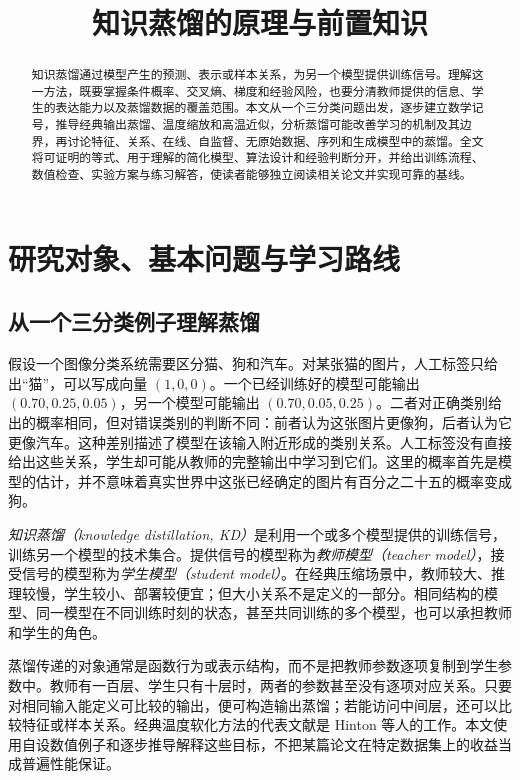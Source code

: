 \documentclass[UTF8,12pt,a4paper,fontset=fandol]{ctexart}
\title{知识蒸馏的原理与前置知识}
\author{}
\date{}
\begin{document}
\maketitle

\begin{abstract}
知识蒸馏通过模型产生的预测、表示或样本关系，为另一个模型提供训练信号。理解这一方法，既要掌握条件概率、交叉熵、梯度和经验风险，也要分清教师提供的信息、学生的表达能力以及蒸馏数据的覆盖范围。本文从一个三分类问题出发，逐步建立数学记号，推导经典输出蒸馏、温度缩放和高温近似，分析蒸馏可能改善学习的机制及其边界，再讨论特征、关系、在线、自监督、无原始数据、序列和生成模型中的蒸馏。全文将可证明的等式、用于理解的简化模型、算法设计和经验判断分开，并给出训练流程、数值检查、实验方案与练习解答，使读者能够独立阅读相关论文并实现可靠的基线。
\end{abstract}
\tableofcontents

\section{研究对象、基本问题与学习路线}
\label{sec:kd-introduction}

\subsection{从一个三分类例子理解蒸馏}
假设一个图像分类系统需要区分猫、狗和汽车。对某张猫的图片，人工标签只给出“猫”，可以写成向量 $(1,0,0)$。一个已经训练好的模型可能输出 $(0.70,0.25,0.05)$，另一个模型可能输出 $(0.70,0.05,0.25)$。二者对正确类别给出的概率相同，但对错误类别的判断不同：前者认为这张图片更像狗，后者认为它更像汽车。这种差别描述了模型在该输入附近形成的类别关系。人工标签没有直接给出这些关系，学生却可能从教师的完整输出中学习到它们。这里的概率首先是模型的估计，并不意味着真实世界中这张已经确定的图片有百分之二十五的概率变成狗。

\emph{知识蒸馏（knowledge distillation, KD）}是利用一个或多个模型提供的训练信号，训练另一个模型的技术集合。提供信号的模型称为\emph{教师模型（teacher model）}，接受信号的模型称为\emph{学生模型（student model）}。在经典压缩场景中，教师较大、推理较慢，学生较小、部署较便宜；但大小关系不是定义的一部分。相同结构的模型、同一模型在不同训练时刻的状态，甚至共同训练的多个模型，也可以承担教师和学生的角色。

蒸馏传递的对象通常是函数行为或表示结构，而不是把教师参数逐项复制到学生参数中。教师有一百层、学生只有十层时，两者的参数甚至没有逐项对应关系。只要对相同输入能定义可比较的输出，便可构造输出蒸馏；若能访问中间层，还可以比较特征或样本关系。经典温度软化方法的代表文献是 Hinton 等人的工作\cite{hinton2015}。本文使用自设数值例子和逐步推导解释这些目标，不把某篇论文在特定数据集上的收益当成普遍性能保证。
\end{document}
